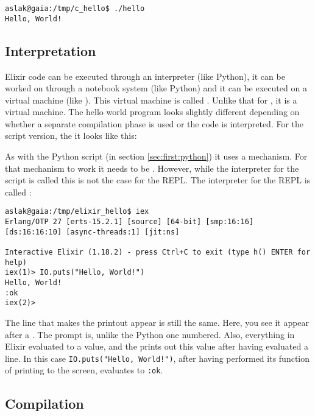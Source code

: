 \begin{verbatim}
aslak@gaia:/tmp/c_hello$ ./hello
Hello, World!
\end{verbatim}


\subsection{Interpretation}

Elixir code can be executed through an interpreter (like Python), it can be worked on through a notebook system (like Python) and it can be executed on a virtual machine (like \csharp). This virtual machine is called . Unlike that for \csharp, it is a  virtual machine. The hello world program looks slightly different depending on whether a separate compilation phase is used or the code is interpreted. For the script version, the it looks like this:


As with the Python script (in section \ref{sec:first:python}) it uses a  mechanism. For that mechanism to work it needs to be . However, while the interpreter for the script is called  this is not the case for the REPL. The interpreter for the REPL is called :

\begin{verbatim}
aslak@gaia:/tmp/elixir_hello$ iex
Erlang/OTP 27 [erts-15.2.1] [source] [64-bit] [smp:16:16] [ds:16:16:10] [async-threads:1] [jit:ns]

Interactive Elixir (1.18.2) - press Ctrl+C to exit (type h() ENTER for help)
iex(1)> IO.puts("Hello, World!")
Hello, World!
:ok
iex(2)> 
\end{verbatim}
The line that makes the printout appear is still the same. Here, you see it appear after a . The  prompt is, unlike the Python one numbered. Also, everything in Elixir evaluated to a value, and the  prints out this value after having evaluated a line. In this case \texttt{IO.puts("Hello, World!")}, after having performed its function of printing  to the screen, evaluates to \texttt{:ok}.

\subsection{Compilation}

